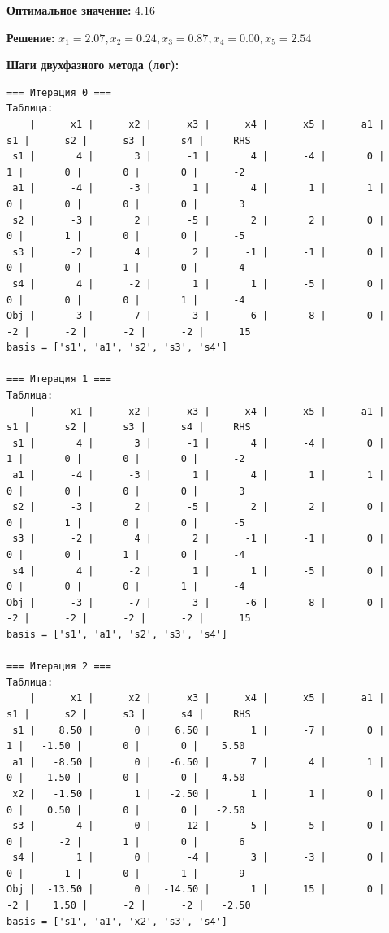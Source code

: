 \documentclass[a4paper,12pt]{article}
\begin{document}
\textbf{Оптимальное значение: }$4.16$

\textbf{Решение: }$x_{1}=2.07, x_{2}=0.24, x_{3}=0.87, x_{4}=0.00, x_{5}=2.54$

\textbf{Шаги двухфазного метода (лог):}

\begin{verbatim}
=== Итерация 0 ===
Таблица:
    |      x1 |      x2 |      x3 |      x4 |      x5 |      a1 |      s1 |      s2 |      s3 |      s4 |     RHS
 s1 |       4 |       3 |      -1 |       4 |      -4 |       0 |       1 |       0 |       0 |       0 |      -2
 a1 |      -4 |      -3 |       1 |       4 |       1 |       1 |       0 |       0 |       0 |       0 |       3
 s2 |      -3 |       2 |      -5 |       2 |       2 |       0 |       0 |       1 |       0 |       0 |      -5
 s3 |      -2 |       4 |       2 |      -1 |      -1 |       0 |       0 |       0 |       1 |       0 |      -4
 s4 |       4 |      -2 |       1 |       1 |      -5 |       0 |       0 |       0 |       0 |       1 |      -4
Obj |      -3 |      -7 |       3 |      -6 |       8 |       0 |      -2 |      -2 |      -2 |      -2 |      15
basis = ['s1', 'a1', 's2', 's3', 's4']

=== Итерация 1 ===
Таблица:
    |      x1 |      x2 |      x3 |      x4 |      x5 |      a1 |      s1 |      s2 |      s3 |      s4 |     RHS
 s1 |       4 |       3 |      -1 |       4 |      -4 |       0 |       1 |       0 |       0 |       0 |      -2
 a1 |      -4 |      -3 |       1 |       4 |       1 |       1 |       0 |       0 |       0 |       0 |       3
 s2 |      -3 |       2 |      -5 |       2 |       2 |       0 |       0 |       1 |       0 |       0 |      -5
 s3 |      -2 |       4 |       2 |      -1 |      -1 |       0 |       0 |       0 |       1 |       0 |      -4
 s4 |       4 |      -2 |       1 |       1 |      -5 |       0 |       0 |       0 |       0 |       1 |      -4
Obj |      -3 |      -7 |       3 |      -6 |       8 |       0 |      -2 |      -2 |      -2 |      -2 |      15
basis = ['s1', 'a1', 's2', 's3', 's4']

=== Итерация 2 ===
Таблица:
    |      x1 |      x2 |      x3 |      x4 |      x5 |      a1 |      s1 |      s2 |      s3 |      s4 |     RHS
 s1 |    8.50 |       0 |    6.50 |       1 |      -7 |       0 |       1 |   -1.50 |       0 |       0 |    5.50
 a1 |   -8.50 |       0 |   -6.50 |       7 |       4 |       1 |       0 |    1.50 |       0 |       0 |   -4.50
 x2 |   -1.50 |       1 |   -2.50 |       1 |       1 |       0 |       0 |    0.50 |       0 |       0 |   -2.50
 s3 |       4 |       0 |      12 |      -5 |      -5 |       0 |       0 |      -2 |       1 |       0 |       6
 s4 |       1 |       0 |      -4 |       3 |      -3 |       0 |       0 |       1 |       0 |       1 |      -9
Obj |  -13.50 |       0 |  -14.50 |       1 |      15 |       0 |      -2 |    1.50 |      -2 |      -2 |   -2.50
basis = ['s1', 'a1', 'x2', 's3', 's4']


\end{verbatim}
\end{document}
